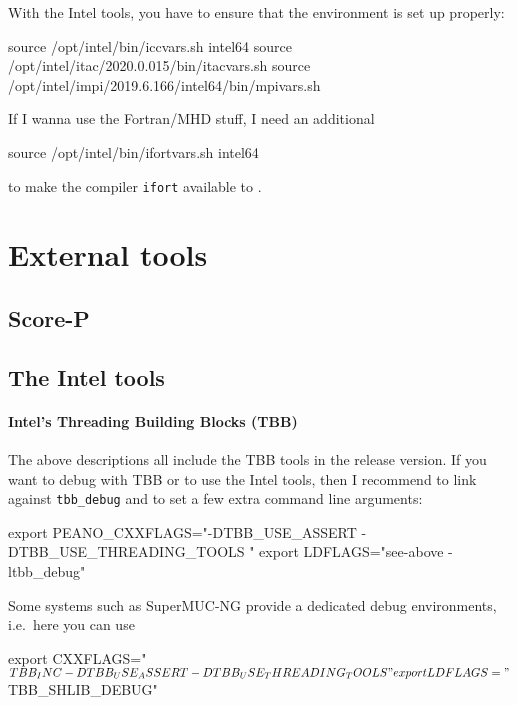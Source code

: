 With the Intel tools, you have to ensure that the environment is set up 
properly:
\begin{code}
source /opt/intel/bin/iccvars.sh intel64
source /opt/intel/itac/2020.0.015/bin/itacvars.sh
source /opt/intel/impi/2019.6.166/intel64/bin/mpivars.sh
\end{code}
\label{label:supercomputer:Intel-scripts}


If I wanna use the Fortran/MHD stuff, I need an additional
\begin{code}
source /opt/intel/bin/ifortvars.sh intel64
\end{code}
to make the compiler \texttt{ifort} available to \Peano.



\section{External tools}


\subsection{Score-P}


\subsection{The Intel tools}
\label{section:supercomputers:IntelTools}

\paragraph{Intel's Threading Building Blocks (TBB)}

The above descriptions all include the TBB tools in the release version.
If you want to debug with TBB or to use the Intel tools, then I recommend to
link against \texttt{tbb\_debug} and to set a few extra command line arguments:

\begin{code}
 export PEANO_CXXFLAGS="-DTBB_USE_ASSERT -DTBB_USE_THREADING_TOOLS "
 export LDFLAGS="see-above   -ltbb_debug"
\end{code}

\noindent
Some systems such as SuperMUC-NG provide a dedicated debug environments,
i.e.~here you can use
\begin{code}
 export CXXFLAGS="$TBB_INC -DTBB_USE_ASSERT -DTBB_USE_THREADING_TOOLS "
 export LDFLAGS="$TBB_SHLIB_DEBUG"
\end{code}



